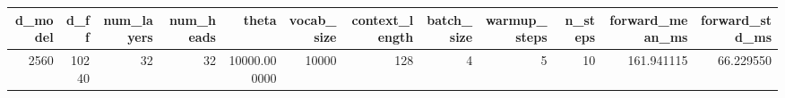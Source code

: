 \begin{tabular}{rrrrrrrrrrrr}
\toprule
d_model & d_ff & num_layers & num_heads & theta & vocab_size & context_length & batch_size & warmup_steps & n_steps & forward_mean_ms & forward_std_ms \\
\midrule
2560 & 10240 & 32 & 32 & 10000.000000 & 10000 & 128 & 4 & 5 & 10 & 161.941115 & 66.229550 \\
\bottomrule
\end{tabular}
